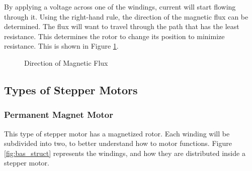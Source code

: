 By applying a voltage across one of the windings, current will 
start flowing through it. Using 
the right-hand rule, the direction of the magnetic flux can be 
determined. The flux will want to 
travel through the path that has the least resistance. This 
determines the rotor to change its 
position to minimize resistance. This is shown in Figure 
\ref{fig:flux}.

\begin{figure}[htp]
	\centering
	\hfill
	\caption{Direction of Magnetic Flux} \cite{figures}
	\label{fig:flux}
\end{figure}
\newpage
\subsection{Types of Stepper Motors}
\subsubsection{Permanent Magnet Motor}
This type of stepper motor has a magnetized rotor. Each winding 
will be subdivided into two, to 
better understand how to motor functions. Figure 
\ref{fig:bas_struct} represents the windings, and 
how they are distributed inside a stepper motor.

